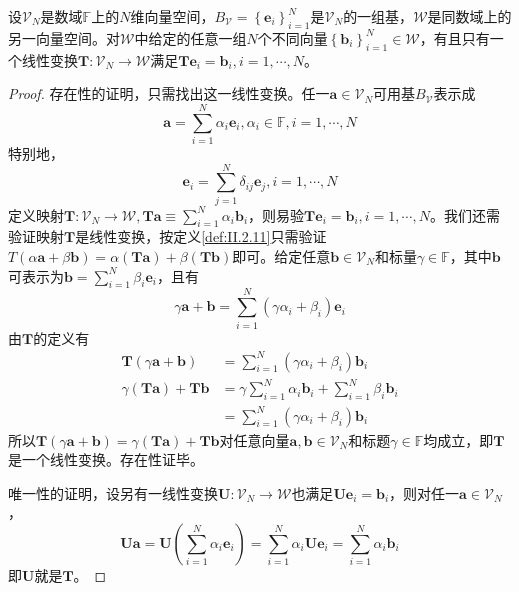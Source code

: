 \documentclass[main.tex]{subfiles}
\begin{document}
\begin{lemma}\label{lem:II.2.1}
    设$\mathcal{V}_N$是数域$\mathbb{F}$上的$N$维向量空间，$B_{\mathcal{V}}=\left\{\mathbf{e}_i\right\}_{i=1}^N$是$\mathcal{V}_N$的一组基，$\mathcal{W}$是同数域上的另一向量空间。对$\mathcal{W}$中给定的任意一组$N$个不同向量$\left\{\mathbf{b}_i\right\}_{i=1}^N\in\mathcal{W}$，有且只有一个线性变换$\mathbf{T}:\mathcal{V}_N\rightarrow\mathcal{W}$满足$\mathbf{Te}_i=\mathbf{b}_i,i=1,\cdots,N$。
\end{lemma}
\begin{proof}
    存在性的证明，只需找出这一线性变换。任一$\mathbf{a}\in\mathcal{V}_N$可用基$B_{\mathcal{V}}$表示成
    \[\mathbf{a}=\sum_{i=1}^N\alpha_i\mathbf{e}_i,\alpha_i\in\mathbb{F},i=1,\cdots,N\]
    特别地，
    \[\mathbf{e}_i=\sum_{j=1}^N\delta_{ij}\mathbf{e}_j,i=1,\cdots,N\]
    定义映射$\mathbf{T}:\mathcal{V}_N\rightarrow\mathcal{W},\mathbf{Ta}\equiv\sum_{i=1}^N\alpha_i\mathbf{b}_i$，则易验$\mathbf{Te}_i=\mathbf{b}_i,i=1,\cdots,N$。我们还需验证映射$\mathbf{T}$是线性变换，按定义\ref{def:II.2.11}只需验证$T\left(\alpha\mathbf{a}+\beta\mathbf{b}\right)=\alpha\left(\mathbf{Ta}\right)+\beta\left(\mathbf{Tb}\right)$即可。给定任意$\mathbf{b}\in\mathcal{V}_N$和标量$\gamma\in\mathbb{F}$，其中$\mathbf{b}$可表示为$\mathbf{b}=\sum_{i=1}^N\beta_i\mathbf{e}_i$，且有
    \[\gamma\mathbf{a}+\mathbf{b}=\sum_{i=1}^N\left(\gamma\alpha_i+\beta_i\right)\mathbf{e}_i\]
    由$\mathbf{T}$的定义有
    \begin{align}
        \mathbf{T}\left(\gamma\mathbf{a}+\mathbf{b}\right) & =\sum_{i=1}^N\left(\gamma\alpha_i+\beta_i\right)\mathbf{b}_i            \\
        \gamma\left(\mathbf{Ta}\right)+\mathbf{Tb}         & =\gamma\sum_{i=1}^N\alpha_i\mathbf{b}_i+\sum_{i=1}^N\beta_i\mathbf{b}_i \\
                                                           & =\sum_{i=1}^N\left(\gamma\alpha_i+\beta_i\right)\mathbf{b}_i
    \end{align}
    所以$\mathbf{T}\left(\gamma\mathbf{a}+\mathbf{b}\right)=\gamma\left(\mathbf{Ta}\right)+\mathbf{Tb}$对任意向量$\mathbf{a},\mathbf{b}\in\mathcal{V}_N$和标题$\gamma\in\mathbb{F}$均成立，即$\mathbf{T}$是一个线性变换。存在性证毕。

    唯一性的证明，设另有一线性变换$\mathbf{U}:\mathcal{V}_N\rightarrow\mathcal{W}$也满足$\mathbf{Ue}_i=\mathbf{b}_i$，则对任一$\mathbf{a}\in\mathcal{V}_N$，
    \[
        \mathbf{Ua}=\mathbf{U}\left(\sum_{i=1}^N\alpha_i\mathbf{e}_i\right)=\sum_{i=1}^N\alpha_i\mathbf{Ue}_i=\sum_{i=1}^N\alpha_i\mathbf{b}_i\]
    即$\mathbf{U}$就是$\mathbf{T}$。
\end{proof}
\end{document}
